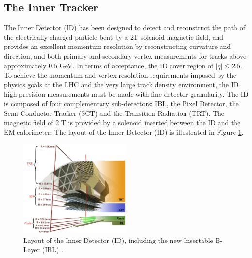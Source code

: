 \subsection{The Inner Tracker}
\label{chap2:ATLAS:ITk}
The Inner Detector (ID) has been designed to detect and reconstruct the path of the electrically charged particle bent by a 2T solenoid magnetic field, and provides an excellent momentum resolution by reconstructing curvature and direction, and both primary and secondary vertex measurements for tracks above approximately 0.5 GeV\cite{ID_TRD, TrkVertexing}. In terms of acceptance, the ID cover region of $|\eta|\leqslant2.5$. To achieve the momentum and vertex resolution requirements imposed by the physics goals at the LHC and the very large track density environment, the ID high-precision measurements must be made with fine detector granularity. The ID is composed of four complementary sub-detectors: IBL, the Pixel Detector, the Semi Conductor Tracker (SCT) and the Transition Radiation (TRT). The magnetic field of 2 T is provided by a solenoid inserted between the ID and the EM calorimeter. The layout of the Inner Detector (ID) is illustrated in Figure \ref{fig:chap2:ATLAS:ITK:ID}.
\begin{figure}[H]
    \centering
    \includegraphics[width=0.5\textwidth]{Ch2/Img/ID_withIBL.png}
    \caption{Layout of the Inner Detector (ID), including the new Insertable B-Layer (IBL) \cite{ID_withIBL}.}
    \label{fig:chap2:ATLAS:ITK:ID}
\end{figure}
